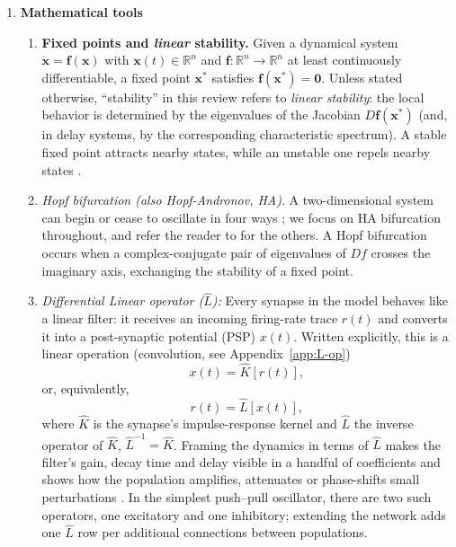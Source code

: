 \documentclass[12pt]{article}
\numberwithin{equation}{section}
\newcommand{\rev}[1]{\begingroup\color{navyblue}#1\endgroup}
\begin{document}
\begin{enumerate}
\begin{enumerate}
 
\end{enumerate}


\item \textbf{Mathematical tools}
\begin{enumerate}
\item 
\rev{\textbf{Fixed points and \emph{linear} stability.}
Given a dynamical system $\dot{\mathbf{x}}=\mathbf{f}(\mathbf{x})$ with
$\mathbf{x}(t)\in\mathbb{R}^n$ and $\mathbf{f}:\mathbb{R}^n\to\mathbb{R}^n$ at least
continuously differentiable, a fixed point $\mathbf{x}^\ast$ satisfies
$\mathbf{f}(\mathbf{x}^\ast)=\mathbf{0}$.
Unless stated otherwise, ``stability'' in this review refers to \emph{linear stability}:
the local behavior is determined by the eigenvalues of the Jacobian
$D\mathbf{f}(\mathbf{x}^\ast)$ (and, in delay systems, by the corresponding characteristic
spectrum).}
A stable fixed point attracts nearby states, while an unstable one repels nearby states \cite{strogatz2018nonlinear}.
\item \textit{Hopf bifurcation (also \textit{Hopf-Andronov}, HA)}. \rev{A two-dimensional system can begin or cease to oscillate in four ways ; we focus on HA bifurcation throughout, and refer the reader to \cite{strogatz2018nonlinear,hoppensteadt2012weakly,kuznetsov2023elements} for the others.
A Hopf bifurcation occurs when a complex-conjugate pair of eigenvalues of $Df$ crosses the imaginary axis, exchanging the stability of a fixed point.}

\item \emph{Differential Linear operator (\(\hat L\)):} Every synapse in the model behaves like a linear filter: it receives an incoming firing-rate trace \(r(t)\) and converts it into a post-synaptic potential (PSP) \(x(t)\).  Written explicitly, this is a linear operation (convolution, see Appendix~\ref{app:L-op})
\begin{equation}
x(t)=\hat K[r(t)] ,
\end{equation}
or, equivalently,
\begin{equation}
r(t)=\hat L[x(t)] ,
\end{equation}
where \(\hat K\) is the synapse’s impulse-response kernel and \(\hat L\) the inverse operator of \(\hat K\), $\hat L^{-1} = \hat K $.  Framing the dynamics in terms of \(\hat L\) makes the filter’s gain, decay time and delay visible in a handful of coefficients and shows how the population amplifies, attenuates or phase-shifts small perturbations \cite{strogatz2018nonlinear}.  In the simplest push–pull oscillator, there are two such operators, one excitatory and one inhibitory; extending the network adds one \(\hat L\) row per additional connections between populations.


\end{enumerate}
\end{enumerate}
\end{document}
